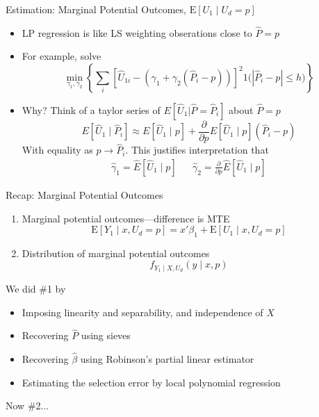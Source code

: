 \documentclass{beamer}
\begin{document}
\begin{frame}{Estimation:  Marginal Potential Outcomes,
    $\mathrm{E}[U_1\mid U_d=p]$}
    \begin{itemize}
  \item LP regression is like LS weighting obserations close to $\hat{P}=p$
\item For example, solve
  \begin{equation*}
   \min_{\gamma_1,\gamma_2} \left\{ \sum_i\left[\hat{U}_{1i}-(\gamma_1 +
      \gamma_2(\hat{P}_i-p))\right]^2\mathrm{1}{\bigl(|\hat{P}_i - p| \le h\bigr)}\right\}
  \end{equation*}
\item Why? Think of a taylor series of $E[\hat{U}_{1}|
 \hat{P}=\hat{P}_i]$
  about $\hat{P} = p$
  \begin{equation*}
    E[\hat{U}_{1}\mid \hat{P}_i] \approx E[\hat{U}_{1}\mid p] +
    \frac{\partial}{\partial p} E[\hat{U}_{1}\mid p] (\hat{P}_i-p)
  \end{equation*}
With equality as $p \rightarrow \hat{P}_i$. This justifies
interpretation that
\begin{eqnarray*}
  \hat{\gamma}_1 = \hat{E}[\hat{U}_{1}\mid p] & & \hat{\gamma}_2 = \frac{\partial}{\partial p} \hat{E}[\hat{U}_{1}\mid p]
\end{eqnarray*}
  \end{itemize}
\end{frame}

\begin{frame}{Recap:  Marginal Potential Outcomes}
\begin{enumerate}
\item Marginal potential outcomes---difference is MTE
\begin{equation*}
  \mathrm{E}[Y_1\mid x,U_d=p] = x'\beta_1 +
  \mathrm{E}[U_1\mid x,U_d=p]
\end{equation*}
\item Distribution of marginal potential outcomes
  \begin{equation*}
    f_{Y_1\mid X,U_d}(y\mid x,p)
  \end{equation*}
\end{enumerate}

We did \#1 by
\begin{itemize}
\item Imposing linearity and separability, and independence of $X$
\item Recovering $\hat{P}$ using sieves
\item Recovering $\hat{\beta}$ using Robinson's partial linear
  estimator
\item Estimating the selection error by local polynomial regression
\end{itemize}
Now \#2...

\end{frame}
\end{document}
